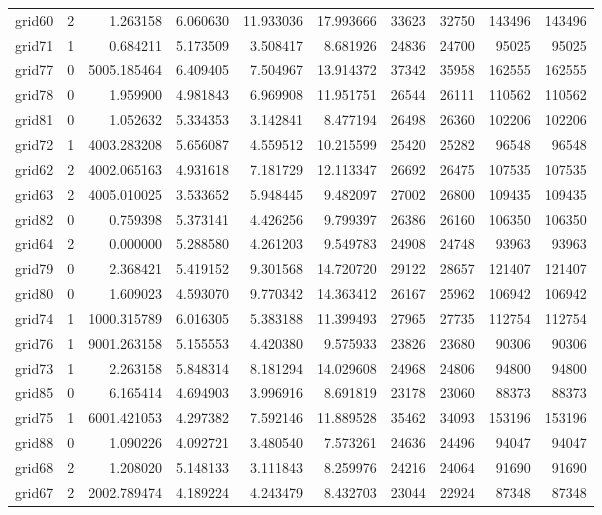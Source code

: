 \begin{longtable}{|l|r|r|r|r|r|r|r|r|r|}
grid60 & 2 & 1.263158 & 6.060630 & 11.933036 & 17.993666 & 33623 & 32750 & 143496 & 143496 \\
grid71 & 1 & 0.684211 & 5.173509 & 3.508417 & 8.681926 & 24836 & 24700 & 95025 & 95025 \\
grid77 & 0 & 5005.185464 & 6.409405 & 7.504967 & 13.914372 & 37342 & 35958 & 162555 & 162555 \\
grid78 & 0 & 1.959900 & 4.981843 & 6.969908 & 11.951751 & 26544 & 26111 & 110562 & 110562 \\
grid81 & 0 & 1.052632 & 5.334353 & 3.142841 & 8.477194 & 26498 & 26360 & 102206 & 102206 \\
grid72 & 1 & 4003.283208 & 5.656087 & 4.559512 & 10.215599 & 25420 & 25282 & 96548 & 96548 \\
grid62 & 2 & 4002.065163 & 4.931618 & 7.181729 & 12.113347 & 26692 & 26475 & 107535 & 107535 \\
grid63 & 2 & 4005.010025 & 3.533652 & 5.948445 & 9.482097 & 27002 & 26800 & 109435 & 109435 \\
grid82 & 0 & 0.759398 & 5.373141 & 4.426256 & 9.799397 & 26386 & 26160 & 106350 & 106350 \\
grid64 & 2 & 0.000000 & 5.288580 & 4.261203 & 9.549783 & 24908 & 24748 & 93963 & 93963 \\
grid79 & 0 & 2.368421 & 5.419152 & 9.301568 & 14.720720 & 29122 & 28657 & 121407 & 121407 \\
grid80 & 0 & 1.609023 & 4.593070 & 9.770342 & 14.363412 & 26167 & 25962 & 106942 & 106942 \\
grid74 & 1 & 1000.315789 & 6.016305 & 5.383188 & 11.399493 & 27965 & 27735 & 112754 & 112754 \\
grid76 & 1 & 9001.263158 & 5.155553 & 4.420380 & 9.575933 & 23826 & 23680 & 90306 & 90306 \\
grid73 & 1 & 2.263158 & 5.848314 & 8.181294 & 14.029608 & 24968 & 24806 & 94800 & 94800 \\
grid85 & 0 & 6.165414 & 4.694903 & 3.996916 & 8.691819 & 23178 & 23060 & 88373 & 88373 \\
grid75 & 1 & 6001.421053 & 4.297382 & 7.592146 & 11.889528 & 35462 & 34093 & 153196 & 153196 \\
grid88 & 0 & 1.090226 & 4.092721 & 3.480540 & 7.573261 & 24636 & 24496 & 94047 & 94047 \\
grid68 & 2 & 1.208020 & 5.148133 & 3.111843 & 8.259976 & 24216 & 24064 & 91690 & 91690 \\
grid67 & 2 & 2002.789474 & 4.189224 & 4.243479 & 8.432703 & 23044 & 22924 & 87348 & 87348 \\

\end{longtable}
